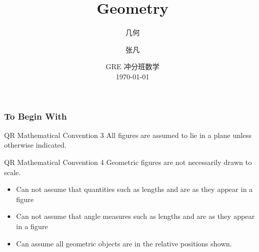 \documentclass[
	11pt, %
	handout,
]{beamer}
\title[Geometry]{Geometry} %
\subtitle{几何} %
\author[张凡]{张凡} %
\institute[XDF]{新东方国际教育 \\ \smallskip \textit{zhangfan@xdf.cn}} %
\date[\today]{GRE 冲分班数学 \\ \today} %
\begin{document}

\begin{frame}
	\titlepage %
\end{frame}



\begin{frame}
	\frametitle{To Begin With} %

	\begin{block}{QR Mathematical Convention 3}
		All figures are assumed to lie in a plane unless otherwise indicated.
	\end{block}

		\begin{block}{QR Mathematical Convention 4}
		Geometric figures are not necessarily drawn to scale.
	\end{block}
	\begin{example}
		\begin{itemize}
			\item \alert{Can not} assume  that quantities such as lengths and  are as they appear in a figure
			\item \alert{Can not} assume  that angle measures such as lengths and  are as they appear in a figure 
			\item \alert{Can} assume all geometric objects are in the relative positions shown.
		\end{itemize}
	\end{example}
\end{frame}

\end{document}
